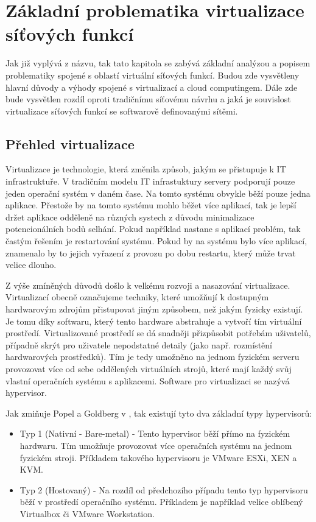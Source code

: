 \chapter{Základní problematika virtualizace síťových funkcí}

Jak již vyplývá z názvu, tak tato kapitola se zabývá základní analýzou a popisem problematiky spojené s oblastí virtuální síťových funkcí. Budou zde vysvětleny hlavní důvody a výhody spojené s virtualizací a cloud computingem. Dále zde bude vysvětlen rozdíl oproti tradičnímu síťovému návrhu a jaká je souvislost virtualizace síťových funkcí se softwarově definovanými sítěmi.

\section{Přehled virtualizace}

Virtualizace je technologie, která změnila způsob, jakým se přistupuje k IT infrastruktuře. V tradičním modelu IT infrastuktury servery podporují pouze jeden operační systém v daném čase. Na tomto systému obvykle běží pouze jedna aplikace. Přestože by na tomto systému mohlo běžet více aplikací, tak je lepší držet aplikace odděleně na různých systech z důvodu minimalizace potencionálních bodů selhání. Pokud například nastane s aplikací problém, tak častým řešením je restartování systému. Pokud by na systému bylo více aplikací, znamenalo by to jejich vyřazení z provozu po dobu restartu, který může trvat velice dlouho. \cite{VM_book}

Z výše zmíněných důvodů došlo k velkému rozvoji a nasazování virtualizace. Virtualizací obecně označujeme techniky, které umožňují k dostupným hardwarovým zdrojům přistupovat jiným způsobem, než jakým fyzicky existují. Je tomu díky softwaru, který tento hardware abstrahuje a vytvoří tím virtuální prostředí. Virtualizované prostředí se dá snadněji přizpůsobit potřebám uživatelů, případně skrýt pro uživatele nepodstatné detaily (jako např. rozmístění hardwarových prostředků). Tím je tedy umožněno na jednom fyzickém serveru provozovat více od sebe oddělených virtuálních strojů, které mají každý svůj vlastní operačních systému s aplikacemi. Software pro virtualizaci se nazývá hypervisor.\cite{VM_book}

Jak zmiňuje Popel a Goldberg v \cite{VM_architektura}, tak existují tyto dva základní typy hypervisorů:

\begin{itemize}
\item Typ 1 (Nativní - Bare-metal) - Tento hypervisor běží přímo na fyzickém hardwaru. Tím umožňuje provozovat více operačních systému na jednom fyzickém stroji. Příkladem takového hypervisoru je VMware ESXi, XEN a KVM.
\item Typ 2 (Hostovaný) - Na rozdíl od předchozího případu tento typ hypervisoru běží v prostředí operačního systému. Příkladem je například velice oblíbený Virtualbox či VMware Workstation.
\end{itemize}

